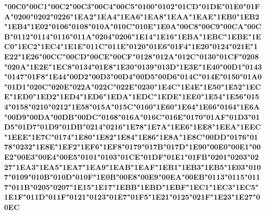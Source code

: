 {\LibertinusSerifPatch\bfseries 
	\char"00C0\gs \char"00C1\gs \char"00C2\gs \char"00C3\gs \char"00C4\gs \char"00C5\gs \char"0100\gs \char"0102\gs \char"01CD\gs \char"01DE\gs \char"01E0\gs \char"01FA\gs \char"0200\gs \char"0202\gs \char"0226\gs \char"1EA2\gs \char"1EA4\gs \char"1EA6\gs \char"1EA8\gs \char"1EAA\gs \char"1EAE\gs \char"1EB0\gs \char"1EB2\gs \char"1EB4\gs \char"1E02\gs \char"0106\gs \char"0108\gs \char"010A\gs \char"010C\gs \char"010E\gs \char"1E0A\gs \char"00C8\gs \char"00C9\gs \char"00CA\gs \char"00CB\gs \char"0112\gs \char"0114\gs \char"0116\gs \char"011A\gs \char"0204\gs \char"0206\gs \char"1E14\gs \char"1E16\gs \char"1EBA\gs \char"1EBC\gs \char"1EBE\gs \char"1EC0\gs \char"1EC2\gs \char"1EC4\gs \char"1E1E\gs \char"011C\gs \char"011E\gs \char"0120\gs \char"01E6\gs \char"01F4\gs \char"1E20\gs \char"0124\gs \char"021E\gs \char"1E22\gs \char"1E26\gs \char"00CC\gs \char"00CD\gs \char"00CE\gs \char"00CF\gs \char"0128\gs \char"012A\gs \char"012C\gs \char"0130\gs \char"01CF\gs \char"0208\gs \char"020A\gs \char"1E2E\gs \char"1EC8\gs \char"0134\gs \char"01E8\gs \char"1E30\gs \char"0139\gs \char"013D\gs \char"1E3E\gs \char"1E40\gs \char"00D1\gs \char"0143\gs \char"0147\gs \char"01F8\gs \char"1E44\gs \char"00D2\gs \char"00D3\gs \char"00D4\gs \char"00D5\gs \char"00D6\gs \char"014C\gs \char"014E\gs \char"0150\gs \char"01A0\gs \char"01D1\gs \char"020C\gs \char"020E\gs \char"022A\gs \char"022C\gs \char"022E\gs \char"0230\gs \char"1E4C\gs \char"1E4E\gs \char"1E50\gs \char"1E52\gs \char"1ECE\gs \char"1ED0\gs \char"1ED2\gs \char"1ED4\gs \char"1ED6\gs \char"1EDA\gs \char"1EDC\gs \char"1EDE\gs \char"1EE0\gs \char"1E54\gs \char"1E56\gs \char"0154\gs \char"0158\gs \char"0210\gs \char"0212\gs \char"1E58\gs \char"015A\gs \char"015C\gs \char"0160\gs \char"1E60\gs \char"1E64\gs \char"1E66\gs \char"0164\gs \char"1E6A\gs \char"00D9\gs \char"00DA\gs \char"00DB\gs \char"00DC\gs \char"0168\gs \char"016A\gs \char"016C\gs \char"016E\gs \char"0170\gs \char"01AF\gs \char"01D3\gs \char"01D5\gs \char"01D7\gs \char"01D9\gs \char"01DB\gs \char"0214\gs \char"0216\gs \char"1E78\gs \char"1E7A\gs \char"1EE6\gs \char"1EE8\gs \char"1EEA\gs \char"1EEC\gs \char"1EEE\gs \char"1E7C\gs \char"0174\gs \char"1E80\gs \char"1E82\gs \char"1E84\gs \char"1E86\gs \char"1E8A\gs \char"1E8C\gs \char"00DD\gs \char"0176\gs \char"0178\gs \char"0232\gs \char"1E8E\gs \char"1EF2\gs \char"1EF6\gs \char"1EF8\gs \char"0179\gs \char"017B\gs \char"017D\gs \char"1E90\gs \char"00E0\gs \char"00E1\gs \char"00E2\gs \char"00E3\gs \char"00E4\gs \char"00E5\gs \char"0101\gs \char"0103\gs \char"01CE\gs \char"01DF\gs \char"01E1\gs \char"01FB\gs \char"0201\gs \char"0203\gs \char"0227\gs \char"1EA3\gs \char"1EA5\gs \char"1EA7\gs \char"1EA9\gs \char"1EAB\gs \char"1EAF\gs \char"1EB1\gs \char"1EB3\gs \char"1EB5\gs \char"1E03\gs \char"0107\gs \char"0109\gs \char"010B\gs \char"010D\gs \char"010F\gs \char"1E0B\gs \char"00E8\gs \char"00E9\gs \char"00EA\gs \char"00EB\gs \char"0113\gs \char"0115\gs \char"0117\gs \char"011B\gs \char"0205\gs \char"0207\gs \char"1E15\gs \char"1E17\gs \char"1EBB\gs \char"1EBD\gs \char"1EBF\gs \char"1EC1\gs \char"1EC3\gs \char"1EC5\gs \char"1E1F\gs \char"011D\gs \char"011F\gs \char"0121\gs \char"0123\gs \char"01E7\gs \char"01F5\gs \char"1E21\gs \char"0125\gs \char"021F\gs \char"1E23\gs \char"1E27\gs \char"00EC\gs }
